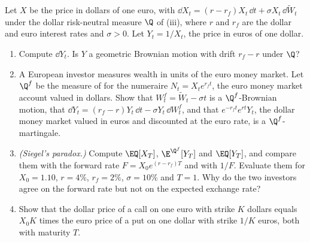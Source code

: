 \begin{exercise}\label{ex:rn-fx}
\medium Let $X$ be the price in dollars of one euro, with
$\dd X_t=(r-r_f)X_t\,\dd t+\sigma X_t\,\dd\widetilde W_t$ under the dollar risk-neutral
measure $\Q$ of (iii), where $r$ and $r_f$ are the dollar and euro
interest rates and $\sigma>0$. Let $Y_t=1/X_t$, the price in euros of one dollar.
\begin{enumerate}[label=(\alph*)]
  \item Compute $\dd Y_t$. Is $Y$ a geometric Brownian motion with drift $r_f-r$ under $\Q$?
  \item A European investor measures wealth in units of the euro money market. Let $\Q^f$ be
    the measure of  for the numeraire $N_t=X_te^{r_ft}$, the euro
    money market account valued in dollars. Show that $W^f_t=\widetilde W_t-\sigma t$ is a
    $\Q^f$-Brownian motion, that $\dd Y_t=(r_f-r)Y_t\,\dd t-\sigma Y_t\,\dd W^f_t$, and that
    $e^{-r_ft}e^{rt}Y_t$, the dollar money market valued in euros and discounted at the euro
    rate, is a $\Q^f$-martingale.
  \item \emph{(Siegel's paradox.)} Compute $\EQ[X_T]$, $\E^{\Q^f}[Y_T]$ and $\EQ[Y_T]$, and
    compare them with the forward rate $F=X_0e^{(r-r_f)T}$ and with $1/F$. Evaluate them for
    $X_0=1.10$, $r=4\%$, $r_f=2\%$, $\sigma=10\%$ and $T=1$. Why do the two investors agree on
    the forward rate but not on the expected exchange rate?
  \item Show that the dollar price of a call on one euro with strike $K$ dollars equals $X_0K$
    times the euro price of a put on one dollar with strike $1/K$ euros, both with maturity
    $T$.
\end{enumerate}
\end{exercise}

